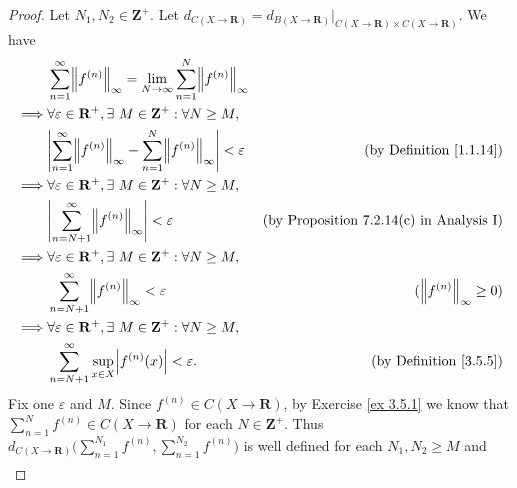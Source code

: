 \begin{proof}
    Let \(N_1, N_2 \in \mathbf{Z}^+\).
    Let \(d_{C(X \to \mathbf{R})} = d_{B(X \to \mathbf{R})}|_{C(X \to \mathbf{R}) \times C(X \to \mathbf{R})}\).
    We have
    \begin{align*}
                 & \sum_{n = 1}^\infty \norm*{f^{(n)}}_\infty = \lim_{N \to \infty} \sum_{n = 1}^N \norm*{f^{(n)}}_\infty                                                    \\
        \implies & \forall \varepsilon \in \mathbf{R}^+, \exists\ M \in \mathbf{Z}^+ : \forall N \geq M,                                                                     \\
                 & \abs*{\sum_{n = 1}^\infty \norm*{f^{(n)}}_\infty - \sum_{n = 1}^N \norm*{f^{(n)}}_\infty} < \varepsilon & \text{(by Definition \ref{1.1.14})}             \\
        \implies & \forall \varepsilon \in \mathbf{R}^+, \exists\ M \in \mathbf{Z}^+ : \forall N \geq M,                                                                     \\
                 & \abs*{\sum_{n = N + 1}^\infty \norm*{f^{(n)}}_\infty} < \varepsilon                                     & \text{(by Proposition 7.2.14(c) in Analysis I)} \\
        \implies & \forall \varepsilon \in \mathbf{R}^+, \exists\ M \in \mathbf{Z}^+ : \forall N \geq M,                                                                     \\
                 & \sum_{n = N + 1}^\infty \norm*{f^{(n)}}_\infty < \varepsilon                                            & (\norm*{f^{(n)}}_\infty \geq 0)                 \\
        \implies & \forall \varepsilon \in \mathbf{R}^+, \exists\ M \in \mathbf{Z}^+ : \forall N \geq M,                                                                     \\
                 & \sum_{n = N + 1}^\infty \sup_{x \in X} \abs*{f^{(n)}(x)} < \varepsilon.                                 & \text{(by Definition \ref{3.5.5})}
    \end{align*}
    Fix one \(\varepsilon\) and \(M\).
    Since \(f^{(n)} \in C(X \to \mathbf{R})\), by Exercise \ref{ex 3.5.1} we know that \(\sum_{n = 1}^N f^{(n)} \in C(X \to \mathbf{R})\) for each \(N \in \mathbf{Z}^+\).
    Thus \(d_{C(X \to \mathbf{R})}\bigg(\sum_{n = 1}^{N_1} f^{(n)}, \sum_{n = 1}^{N_2} f^{(n)}\bigg)\) is well defined for each \(N_1, N_2 \geq M\) and
    \begin{align*}

\end{align*}
\end{proof}
